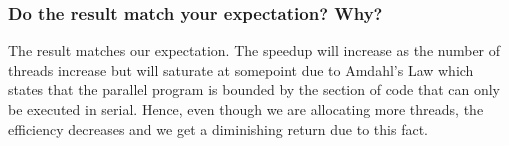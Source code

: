 \subsubsection{Do the result match your expectation? Why?}

The result matches our expectation. The speedup will increase as the number
of threads increase but will saturate at somepoint due to Amdahl's Law which
states that the parallel program is bounded by the section of code that 
can only be executed in serial. Hence, even though we are allocating more
threads, the efficiency decreases and we get a diminishing return due to this
fact.